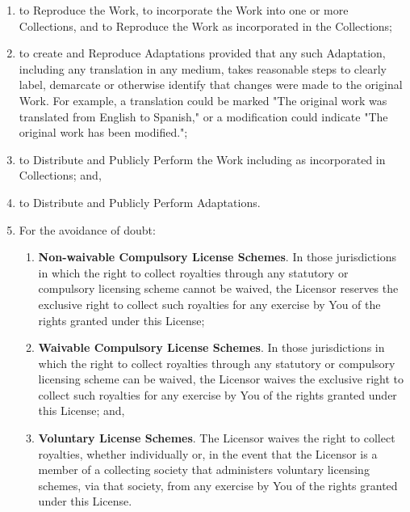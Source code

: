 \begin{enumerate}
\item to Reproduce the Work, to incorporate the Work into
  one or more Collections, and to Reproduce the Work as
  incorporated in the Collections;

\item to create and Reproduce Adaptations provided that any
  such Adaptation, including any translation in any medium,
  takes reasonable steps to clearly label, demarcate or
  otherwise identify that changes were made to the original
  Work. For example, a translation could be marked "The
  original work was translated from English to Spanish," or
  a modification could indicate "The original work has been
  modified.";

\item to Distribute and Publicly Perform the Work including
  as incorporated in Collections; and,

\item to Distribute and Publicly Perform Adaptations.

\item
\par
For the avoidance of doubt:

\begin{enumerate}
   \item \textbf{Non-waivable Compulsory License
      Schemes}. In those jurisdictions in which the
      right to collect royalties through any statutory or
      compulsory licensing scheme cannot be waived, the
      Licensor reserves the exclusive right to collect such
      royalties for any exercise by You of the rights
      granted under this License;

   \item \textbf{Waivable Compulsory License
      Schemes}. In those jurisdictions in which the
      right to collect royalties through any statutory or
      compulsory licensing scheme can be waived, the
      Licensor waives the exclusive right to collect such
      royalties for any exercise by You of the rights
      granted under this License; and,

   \item \textbf{Voluntary License Schemes}. The
      Licensor waives the right to collect royalties,
      whether individually or, in the event that the
      Licensor is a member of a collecting society that
      administers voluntary licensing schemes, via that
      society, from any exercise by You of the rights
      granted under this License.
\end{enumerate}
\end{enumerate}

